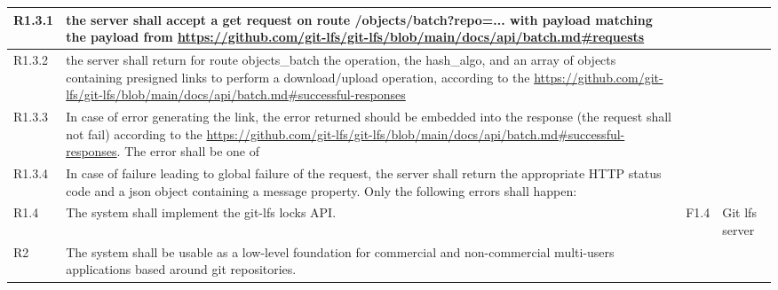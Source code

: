 \documentclass[a4paper,11pt]{article}
\begin{document}
\begin{landscape}
\begin{longtable}{|p{1cm}|p{19cm}|p{2cm}|p{3cm}|}
        \rowcolor[HTML]{EEFFEE}        R1.3.1     & the server shall accept a get request on route /objects/batch?repo=... with payload matching the payload from \url{https://github.com/git-lfs/git-lfs/blob/main/docs/api/batch.md#requests}                                                                                           &                       &                                          \\\hline
        \rowcolor[HTML]{EEFFEE}        R1.3.2     & the server shall return for route objects\_batch the operation, the hash\_algo, and an array of objects containing presigned links to perform a download/upload operation, according to the \url{https://github.com/git-lfs/git-lfs/blob/main/docs/api/batch.md#successful-responses} &                       &                                          \\\hline
        \rowcolor[HTML]{EEFFEE}        R1.3.3     & In case of error generating the link, the error returned should be embedded into the response (the request shall not fail) according to the \url{https://github.com/git-lfs/git-lfs/blob/main/docs/api/batch.md#successful-responses}. The error shall be one of                      &                       &                                          \\\hline
        \rowcolor[HTML]{EEFFEE}        R1.3.4     & In case of failure leading to global failure of the request, the server shall return the appropriate HTTP status code and a json object containing a message property. Only the following errors shall happen:                                                                        &                       &                                          \\\hline
        \rowcolor[HTML]{DDFFDD}        R1.4       & The system shall implement the git-lfs locks API.                                                                                                                                                                                                                                     & F1.4                  & Git lfs server                           \\ \hline
        \rowcolor[HTML]{C0C0C0}        R2         & The system shall be usable as a low-level foundation for commercial and non-commercial multi-users applications based around git repositories.                                                                                                                                        &                       &                                          \\ \hline

\end{longtable}
\end{landscape}
\end{document}
